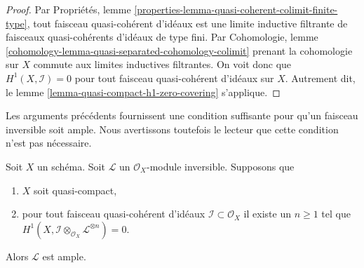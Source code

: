 \begin{proof}
Par
Propriétés, lemme \ref{properties-lemma-quasi-coherent-colimit-finite-type},
tout faisceau quasi-cohérent d'idéaux est une limite inductive filtrante
de faisceaux quasi-cohérents d'idéaux de type fini.
Par Cohomologie, lemme \ref{cohomology-lemma-quasi-separated-cohomology-colimit}
prenant la cohomologie sur $X$ commute aux limites inductives
filtrantes. On voit donc que $H^1(X, \mathcal{I}) = 0$
pour tout faisceau quasi-cohérent d'idéaux sur $X$. Autrement
dit, le lemme \ref{lemma-quasi-compact-h1-zero-covering} s'applique.
\end{proof}

\noindent
Les arguments précédents fournissent une condition suffisante pour qu'un faisceau
inversible soit ample. Nous avertissons toutefois le lecteur que cette
condition n'est pas nécessaire.

\begin{lemma}
\label{lemma-quasi-compact-h1-zero-invertible}
Soit $X$ un schéma. Soit $\mathcal{L}$ un $\mathcal{O}_X$-module
inversible. Supposons que
\begin{enumerate}
\item $X$ soit quasi-compact,
\item pour tout faisceau quasi-cohérent d'idéaux
$\mathcal{I} \subset \mathcal{O}_X$
il existe un $n \geq 1$ tel que
$H^1(X, \mathcal{I} \otimes_{\mathcal{O}_X} \mathcal{L}^{\otimes n}) = 0$.
\end{enumerate}
Alors $\mathcal{L}$ est ample.
\end{lemma}

